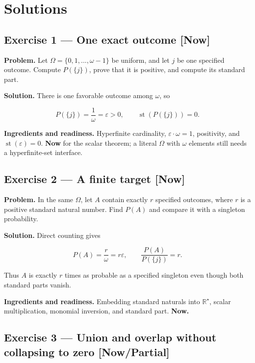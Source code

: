 \documentclass[11pt]{article}
\newcommand{\Rstar}{\mathbb{R}^{\star}}
\newcommand{\eps}{\varepsilon}
\renewcommand{\epsilon}{\varepsilon}
\newcommand{\st}{\operatorname{st}}
\begin{document}
\section*{Solutions}


\subsection*{Exercise 1 --- One exact outcome \hfill \normalfont\small[Now]}

\textbf{Problem.} Let $\Omega = \{0, 1, ..., \omega - 1\}$ be uniform, and let $j$ be
one specified outcome. Compute $P(\{j\})$, prove that it is positive, and compute
its standard part.

\textbf{Solution.} There is one favorable outcome among $\omega$, so

\[
P(\{j\})=\frac1\omega=\epsilon>0,
\qquad \operatorname{st}(P(\{j\}))=0.
\]

\textbf{Ingredients and readiness.} Hyperfinite cardinality, $\eps \cdot  \omega = 1$,
positivity, and $\st(\eps) = 0$. \textbf{Now} for the scalar theorem; a literal
$\Omega$ with $\omega$ elements still needs a hyperfinite-set interface.


\subsection*{Exercise 2 --- A finite target \hfill \normalfont\small[Now]}

\textbf{Problem.} In the same $\Omega$, let $A$ contain exactly $r$ specified
outcomes, where $r$ is a positive standard natural number. Find $P(A)$ and
compare it with a singleton probability.

\textbf{Solution.} Direct counting gives

\[
P(A)=\frac r\omega=r\epsilon,
\qquad \frac{P(A)}{P(\{j\})}=r.
\]

Thus $A$ is exactly $r$ times as probable as a specified singleton even though
both standard parts vanish.

\textbf{Ingredients and readiness.} Embedding standard naturals into $\Rstar$, scalar
multiplication, monomial inversion, and standard part. \textbf{Now.}


\subsection*{Exercise 3 --- Union and overlap without collapsing to zero \hfill \normalfont\small[Now/Partial]}
\end{document}
